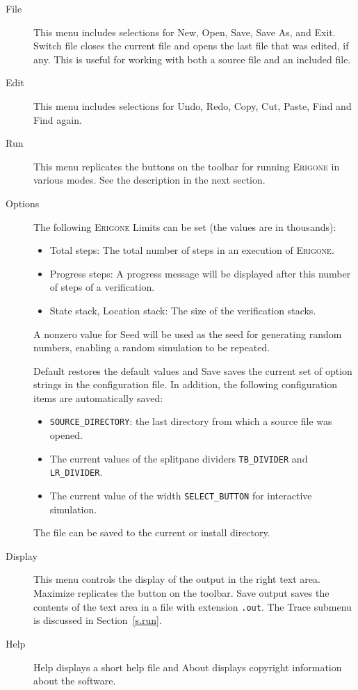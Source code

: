 \documentclass[11pt]{article}
\newcommand{\eri}{\textsc{Erigone}}
\newcommand{\p}[1]{\texttt{#1}}
\newcommand{\bu}[1]{\textsf{#1}}
\begin{document}
\begin{description}
\item[\bu{File}] This menu includes selections for \bu{New}, \bu{Open}, 
\bu{Save}, \bu{Save As}, and \bu{Exit}. \bu{Switch file} closes the 
current file and opens the last file that was edited, if any. This is 
useful for working with both a source file and an included file.

\item[\bu{Edit}] This menu includes selections for \bu{Undo}, \bu{Redo}, 
\bu{Copy}, \bu{Cut}, \bu{Paste}, \bu{Find} and \bu{Find again}.

\item[\bu{Run}] This menu replicates the buttons on the toolbar for
running \eri{} in various modes. See the description in the next
section.

\item[\bu{Options}] The following \eri{} \bu{Limits} can be set (the
values are in thousands):
\begin{itemize}
\item \bu{Total steps}: The total number of steps in an execution of
\eri{}.
\item \bu{Progress steps}: A progress message will be displayed
after this number of steps of a verification.
\item \bu{State stack}, \bu{Location stack}: The size of the
verification stacks.
\end{itemize}

A nonzero value for \bu{Seed} will be used as the seed for generating
random numbers, enabling a random simulation to be repeated.

\bu{Default} restores the default 
values and \bu{Save} saves the current set of option strings in the 
configuration file. In addition, the following configuration items are
automatically saved:
\begin{itemize}
\item \p{SOURCE\_DIRECTORY}: the last directory from which a source file was opened.
\item The current values of the splitpane dividers \p{TB\_DIVIDER} and
\p{LR\_DIVIDER}.
\item The current value of the width \p{SELECT\_BUTTON} for interactive
simulation.
\end{itemize}
The file can be saved
to the \bu{current} or \bu{install} directory.

\item[\bu{Display}] This menu controls the display of the output in the
right text area. \bu{Maximize} replicates the button on the toolbar.
\bu{Save output} saves the contents of the text area in a file with
extension \p{.out}. The \bu{Trace} submenu is discussed in
Section~\ref{s.run}.

\item[\bu{Help}] \bu{Help} displays a short help file and \bu{About} 
displays copyright information about the software.
\end{description}
\end{document}
